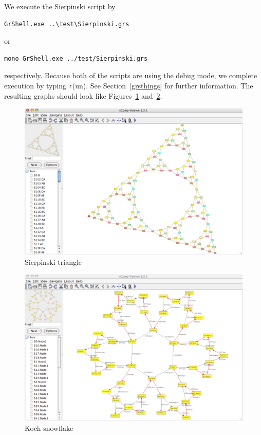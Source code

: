 We execute the Sierpinski script by
\begin{verbatim}
GrShell.exe ..\test\Sierpinski.grs
\end{verbatim}
or
\begin{verbatim}
mono GrShell.exe ../test/Sierpinski.grs
\end{verbatim}
respectively. Because both of the scripts are using the debug mode, we complete execution by typing \texttt{r}(un). See Section~\ref{grsthings} for further information. The resulting graphs should look like Figures~\ref{figsierp} and~\ref{figsnowflake}.
\begin{figure}[htbp]
  \centering
  \includegraphics[width=\textwidth]{fig/sierpinski}
  \caption{Sierpinski triangle}
  \label{figsierp}
\end{figure}
\begin{figure}[htbp]
  \centering
  \includegraphics[width=\textwidth]{fig/snowflake}
  \caption{Koch snowflake}
  \label{figsnowflake}
\end{figure}
\vfill\pagebreak


